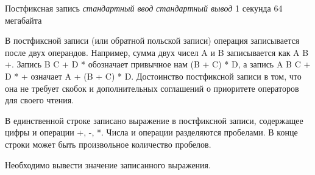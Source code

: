 \begin{problem}%
{Постфиксная запись}%
{\textsl{стандартный ввод}}%
{\textsl{стандартный вывод}}%
{1 секунда}%
{64 мегабайта}%
{}

В постфиксной записи (или обратной польской записи) операция записывается после двух операндов. Например, сумма двух чисел A и B записывается как A B +. Запись B C + D * обозначает привычное нам (B + C) * D, а запись A B C + D * + означает A + (B + C) * D. Достоинство постфиксной записи в том, что она не требует скобок и дополнительных соглашений о приоритете операторов для своего чтения.

\InputFile

В единственной строке записано выражение в постфиксной записи, содержащее цифры и операции +, -, *. Числа и операции разделяются пробелами. В конце строки может быть произвольное количество пробелов.

\OutputFile

Необходимо вывести значение записанного выражения.

\Examples

\begin{example}
%
\end{example}
\end{problem}
